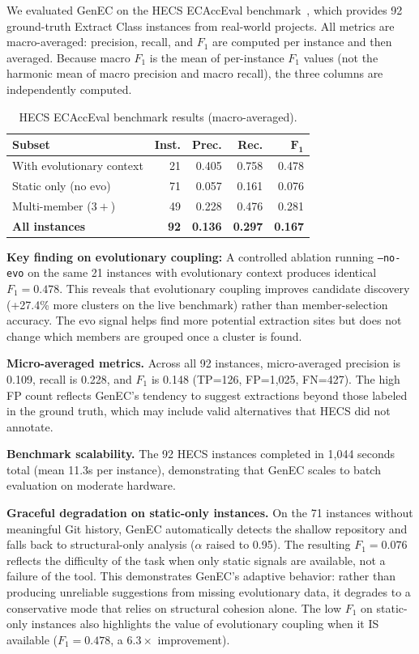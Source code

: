 \documentclass[sigconf]{acmart}
\begin{document}
We evaluated GenEC on the HECS ECAccEval benchmark~\cite{Cui2024HECS}, which
provides 92 ground-truth Extract Class instances from real-world projects. All
metrics are macro-averaged: precision, recall, and $F_1$ are computed per
instance and then averaged. Because macro $F_1$ is the mean of per-instance
$F_1$ values (not the harmonic mean of macro precision and macro recall), the
three columns are independently computed.

\begin{table}[t]
\centering\small
\caption{HECS ECAccEval benchmark results (macro-averaged).}
\label{tab:hecs}
\begin{tabular}{@{}lrrrr@{}}
\toprule
\textbf{Subset} & \textbf{Inst.} & \textbf{Prec.} & \textbf{Rec.} & $\boldsymbol{F_1}$ \\
\midrule
With evolutionary context & 21 & 0.405 & 0.758 & 0.478 \\
Static only (no evo)      & 71 & 0.057 & 0.161 & 0.076 \\
Multi-member ($3{+}$)     & 49 & 0.228 & 0.476 & 0.281 \\
\textbf{All instances}    & \textbf{92} & \textbf{0.136} & \textbf{0.297} & \textbf{0.167} \\
\bottomrule
\end{tabular}
\end{table}

\textbf{Key finding on evolutionary coupling:}  A controlled ablation running
\texttt{--no-evo} on the same 21 instances with evolutionary context produces
identical $F_1{=}0.478$. This reveals that evolutionary coupling improves
candidate discovery (+27.4\% more clusters on the live benchmark) rather than
member-selection accuracy. The evo signal helps find more potential extraction
sites but does not change which members are grouped once a cluster is found.

\textbf{Micro-averaged metrics.}  Across all 92 instances, micro-averaged
precision is 0.109, recall is 0.228, and $F_1$ is 0.148 (TP=126, FP=1,025,
FN=427). The high FP count reflects GenEC's tendency to suggest extractions
beyond those labeled in the ground truth, which may include valid alternatives
that HECS did not annotate.

\textbf{Benchmark scalability.}  The 92 HECS instances completed in 1,044
seconds total (mean 11.3s per instance), demonstrating that GenEC scales to
batch evaluation on moderate hardware.

\textbf{Graceful degradation on static-only instances.}  On the 71 instances
without meaningful Git history, GenEC automatically detects the shallow
repository and falls back to structural-only analysis ($\alpha$ raised to
0.95). The resulting $F_1{=}0.076$ reflects the difficulty of the task when
only static signals are available, not a failure of the tool. This
demonstrates GenEC's adaptive behavior: rather than producing unreliable
suggestions from missing evolutionary data, it degrades to a conservative
mode that relies on structural cohesion alone. The low $F_1$ on static-only
instances also highlights the value of evolutionary coupling when it IS
available ($F_1{=}0.478$, a $6.3\times$ improvement).
\end{document}
